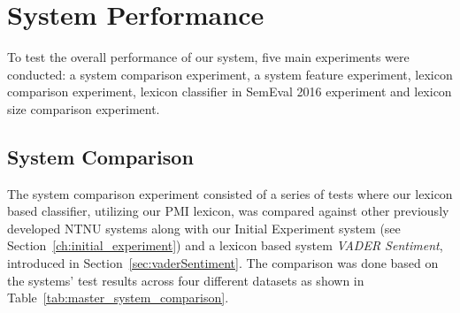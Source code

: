 \section{System Performance}
\label{sec:system_performance}
To test the overall performance of our system, five main experiments were conducted: a system comparison experiment, a system feature experiment, lexicon comparison experiment, lexicon classifier in SemEval 2016 experiment and lexicon size comparison experiment.  

\subsection{System Comparison}
\label{sec:system_comparison}
The system comparison experiment consisted of a series of tests where our lexicon based classifier, utilizing our PMI lexicon, was compared against other previously developed NTNU systems along with our Initial Experiment system (see Section~\ref{ch:initial_experiment}) and a lexicon based system \textit{VADER Sentiment}, introduced in Section~\ref{sec:vaderSentiment}. The comparison was done based on the systems' test results across four different datasets as shown in Table~\ref{tab:master_system_comparison}. \\

